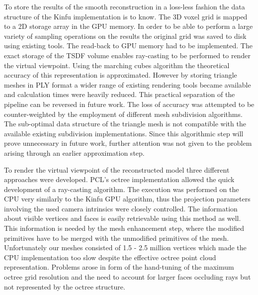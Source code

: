 \documentclass{ucl_thesis}
\begin{document}
\par To  store the results of the smooth reconstruction in a loss-less fashion the data structure of the Kinfu implementation is to know. The 3D voxel grid is mapped to a 2D storage array in the GPU memory. In order to be able to perform a large variety of sampling operations on the results the original grid was saved to disk using existing tools. The read-back to GPU memory had to be implemented. The exact storage of the TSDF volume enables ray-casting to be performed to render the virtual viewpoint. Using the marching cubes algorithm the theoretical accuracy of this representation is approximated. However by storing triangle meshes in PLY format a wider range of existing rendering tools became available and calculation times were heavily reduced. This practical separation of the pipeline can be reversed in future work. The loss of accuracy was attempted to be counter-weighted by the employment of different mesh subdivision algorithms. The sub-optimal data structure of the triangle mesh is not compatible with the available existing subdivision implementations. Since this algorithmic step will prove unnecessary in future work, further attention was not given to the problem arising through an earlier approximation step.

\par To render the virtual viewpoint of the reconstructed model three different approaches were developed. PCL's octree implementation allowed the quick development of a ray-casting algorithm. The execution was performed on the CPU very similarly to the Kinfu GPU algorithm, thus the projection parameters involving the used camera intrinsics were closely controlled. The information about visible vertices and faces is easily retrievable using this method as well. This information is needed by the mesh enhancement step, where the modified primitives have to be merged with the unmodified primitives of the mesh. Unfortunately our meshes consisted of 1.5 - 2.5 million vertices which made the CPU implementation too slow despite the effective octree point cloud representation. Problems arose in form of the hand-tuning of the maximum octree grid resolution and the need to account for larger faces occluding rays but not represented by the octree structure.
\end{document}

